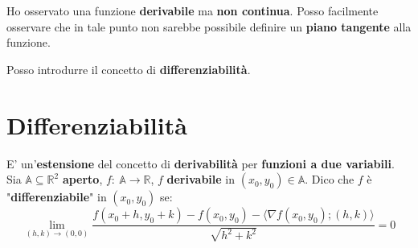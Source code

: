 \documentclass[a4paper, oneside]{article}
\newcommand\R{\mathbb{R}}
\newcommand\A{\mathbb{A}}
\begin{document}
    \noindent Ho osservato una funzione \textbf{derivabile} ma \textbf{non continua}. Posso facilmente osservare che in tale punto non sarebbe possibile
    definire un \textbf{piano tangente} alla funzione. 
    \begin{center}
    \end{center}

    \noindent Posso introdurre il concetto di \textbf{differenziabilità}.

    \newpage

    \section{Differenziabilità}

    E' un'\textbf{estensione} del concetto di \textbf{derivabilità} per \textbf{funzioni a due variabili}.\\

    \noindent Sia $\A\subseteq\R^2$ \textbf{aperto}, $f: \ \A\to\R$, $f$ \textbf{derivabile} in $(x_0,y_0)\in\A$. Dico che $f$ è "\textbf{differenziabile}" in $(x_0,y_0)$ se:
    \[\lim_{(h,k)\to(0,0)} \frac{f(x_0+h,y_0+k) - f(x_0,y_0) - \langle \nabla f(x_0,y_0);(h,k)\rangle}{\sqrt{h^2+k^2}} = 0\]
\end{document}
